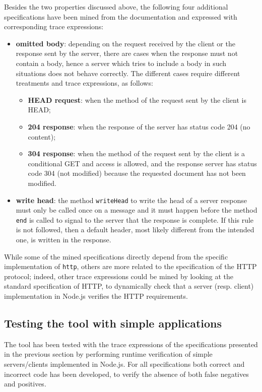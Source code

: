 Besides the two properties discussed above, the following four additional specifications have been mined from
the documentation and expressed with corresponding trace expressions:
\begin{itemize}
\item \textbf{omitted body}: depending on the request received by the client or the response sent by the server, there are cases when the response must not
  contain a body, hence
  a server which tries to include a body in such situations does not behave correctly. The different cases require
  different treatments and trace expressions, as follows:
  \begin{itemize}
  \item \textbf{HEAD request}: when the method of the request sent by the client is HEAD;
  \item \textbf{204 response}: when the response of the server has status code 204 (no content);
  \item \textbf{304 response}: when the method of the request sent by the client is a conditional GET and access is allowed, and the response
    server has status code 304 (not modified) because the requested document has not been modified.
  \end{itemize}
\item \textbf{write head}: the method \lstinline{writeHead} to write the head of a server response must only be called once on a message and it must happen before
  the method \lstinline{end} is called to signal to the server that the response is complete. If this rule is not followed, then
  a default header, most likely different from the intended one, is written in the response.
\end{itemize}
While some of the mined specifications directly depend from the specific implementation of \lstinline{http}, others
are more related to the specification of the HTTP protocol; indeed, other trace expressions could be mined by looking at the
standard specification of HTTP, to dynamically check that a server (resp. client) implementation in Node.js verifies the HTTP
requirements.

\subsection{Testing the tool with simple applications}
\label{sec:simple-test}
The tool has been tested with the trace expressions of the specifications presented in the previous section by performing
runtime verification of simple servers/clients implemented in Node.js.
For all specifications both correct and incorrect code has been developed, to verify the absence of both false negatives and positives.

